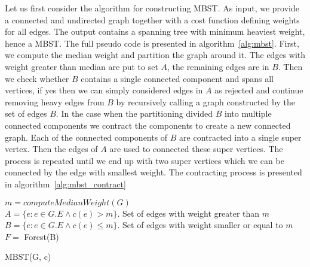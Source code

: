 \documentclass[runningheads, a4paper]{llncs}
\begin{document}
Let us first consider the algorithm for constructing MBST. As input, we provide a connected and undirected graph together with a cost function defining weights for all edges. The output contains a spanning tree with minimum heaviest weight, hence a MBST. The full pseudo code is presented in algorithm~\ref{alg:mbst}. First, we compute the median weight and partition the graph around it. The edges with weight greater than median are put to set $A$, the remaining edges are in $B$. Then we check whether $B$ contains a single connected component and spans all vertices, if yes then we can simply considered edges in $A$ as rejected and continue removing heavy edges from $B$ by recursively calling a graph constructed by the set of edges $B$. In the case when the partitioning divided $B$ into multiple connected components we contract the components to create a new connected graph. Each of the connected components of $B$ are contracted into a single super vertex. Then the edges of $A$ are used to connected these super vertices. The process is repeated until we end up with two super vertices which we can be connected by the edge with smallest weight.
The contracting process is presented in algorithm~\ref{alg:mbst_contract}
        
\begin{algorithm}[H]
    
    
    $m = computeMedianWeight(G)$ \\
    $A = \{e : {e {\in G.E}} \land c(e) > m \}$. Set of edges with weight greater than $m$ \\
    $B = \{e : {e{\in G.E}} \land c(e) \leq m \}$. Set of edges with weight smaller or equal to $m$ \\
    $F =$ Forest(B) \\
    
    
    \caption{MBST(G, c)}
    \label{alg:mbst}
\end{algorithm}
\end{document}
